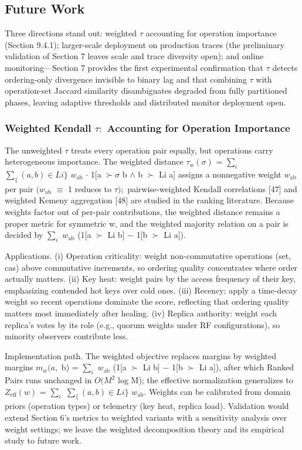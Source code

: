 \documentclass[11pt]{article}
\begin{document}
\subsection{Future Work}
Three directions stand out: weighted $\tau $ accounting for operation importance (Section 9.4.1); larger-scale deployment on production traces (the preliminary validation of Section 7 leaves scale and trace diversity open); and online monitoring—Section 7 provides the first experimental confirmation that $\tau $ detects ordering-only divergence invisible to binary lag and that combining $\tau $ with operation-set Jaccard similarity disambiguates degraded from fully partitioned phases, leaving adaptive thresholds and distributed monitor deployment open.

\subsubsection{Weighted Kendall $\tau :$ Accounting for Operation Importance}
The unweighted $\tau $ treats every operation pair equally, but operations carry heterogeneous importance. The weighted distance $\tau _{w}(\sigma )$ = $\sum_{i} $ $\sum _\{(a,b)\in Li\}$ $w_{\mathrm{ab}}$ $\cdot $ 1[a $\succ \sigma $ b $\wedge $ b $\succ $ Li a] assigns a nonnegative weight $w_{\mathrm{ab}}$ per pair $(w_{\mathrm{ab}}$ $\equiv $ 1 reduces to $\tau );$ pairwise-weighted Kendall correlations [47] and weighted Kemeny aggregation [48] are studied in the ranking literature. Because weights factor out of per-pair contributions, the weighted distance remains a proper metric for symmetric w, and the weighted majority relation on a pair is decided by $\sum_{i} $ $w_{\mathrm{ab}}$ (1[a $\succ $ Li b] $-$ 1[b $\succ $ Li a]).

Applications. (i) Operation criticality: weight non-commutative operations (set, cas) above commutative increments, so ordering quality concentrates where order actually matters. (ii) Key heat: weight pairs by the access frequency of their key, emphasizing contended hot keys over cold ones. (iii) Recency: apply a time-decay weight so recent operations dominate the score, reflecting that ordering quality matters most immediately after healing. (iv) Replica authority: weight each replica's votes by its role (e.g., quorum weights under RF configurations), so minority observers contribute less.

Implementation path. The weighted objective replaces margins by weighted margins $m_{w}(a,$ b) = $\sum_{i} $ $w_{\mathrm{ab}}$ (1[a $\succ $ Li b] $-$ 1[b $\succ $ Li a]), after which Ranked Pairs runs unchanged in $O(M^{2}$ log M); the effective normalization generalizes to $Z_{\mathrm{eff}}(w)$ = $\sum_{i} $ $\sum _\{(a,b)\in Li\}$ $w_{\mathrm{ab}}.$ Weights can be calibrated from domain priors (operation types) or telemetry (key heat, replica load). Validation would extend Section 6's metrics to weighted variants with a sensitivity analysis over weight settings; we leave the weighted decomposition theory and its empirical study to future work.
\end{document}
